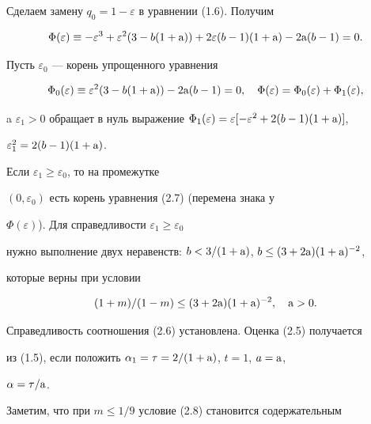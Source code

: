 \begin{pf} 


Сделаем замену $q_0=1-\varepsilon$ в уравнении (1.6). Получим 


\begin{equation} 


\Phi(\varepsilon)\equiv-\varepsilon^3+\varepsilon^2 


(3-b(1+\A))+2\varepsilon(b-1)(1+\A) 


-2\A(b-1)=0. 


\end{equation} 


Пусть $\varepsilon_0$ --- корень упрощенного уравнения 


$$ 


\Phi_0(\varepsilon)\equiv\varepsilon^2(3-b(1+\A))-2\A(b-1)=0,\quad 


\Phi(\varepsilon)=\Phi_0(\varepsilon)+\Phi_1(\varepsilon), 


$$ 


a $\varepsilon_1>0$ обращает в нуль выражение $\Phi_1(\varepsilon)= 


\varepsilon[-\varepsilon^2+2(b-1)(1+\A)]$, 


$\varepsilon^2_1=2(b-1)(1+\mathrm a)$. 


Если $\varepsilon_1\ge\varepsilon_0$, то на промежутке 


$(0,\varepsilon_0)$ есть корень уравнения (2.7) (перемена знака у 


$\Phi(\varepsilon)$). Для справедливости $\varepsilon_1\ge\varepsilon_0$ 


нужно выполнение двух неравенств: $b<3/(1+\mathrm a)$, $b\le(3+2\mathrm a)(1+\mathrm a)^{-2}$, 


которые верны при условии 


\begin{equation} 


(1+m)/(1-m)\le(3+2\A)(1+\A)^{-2},\quad \A>0. 


\end{equation} 


Справедливость соотношения (2.6) установлена. Оценка (2.5) получается 


из (1.5), если положить $\alpha_1=\tau=2/(1+\mathrm a)$, $t=1$, $a=\mathrm a$, 


$\alpha=\tau/\mathrm a$. 


\end{pf} 


 


Заметим, что при $m\le1/9$ условие (2.8) становится содержательным 


